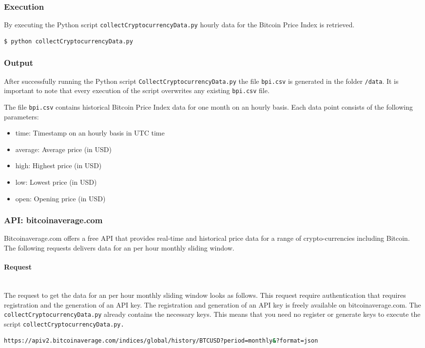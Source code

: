 \documentclass[a4paper,12pt]{article}
\begin{document}
\begin{spacing}{1.2}
\subsubsection{Execution}
By executing the Python script \verb|collectCryptocurrencyData.py| hourly data for the Bitcoin Price Index is retrieved.
\begin{lstlisting}[language=bash]
    $ python collectCryptocurrencyData.py
\end{lstlisting}

\subsubsection{Output}
After successfully running the Python script \verb|CollectCryptocurrencyData.py| the file \verb|bpi.csv| is generated in the folder \verb|/data|. It is important to note that every execution of the script overwrites any existing \verb|bpi.csv| file.

The file \verb|bpi.csv| contains historical Bitcoin Price Index data for one month on an hourly basis. Each data point consists of the following parameters:
\begin{itemize}
    \item time: Timestamp on an hourly basis in UTC time
    \item average: Average price (in USD)
    \item high: Highest price (in USD)
    \item low: Lowest price (in USD)
    \item open: Opening price (in USD)
\end{itemize}

\subsubsection{API: bitcoinaverage.com}
Bitcoinaverage.com offers a free API that provides real-time and historical price data for a range of crypto-currencies including Bitcoin. The following requests delivers data for an per hour monthly sliding window.

\paragraph{Request}\mbox{}\\
The request to get the data for an per hour monthly sliding window looks as follows. This request require authentication that requires registration and the generation of an API key. The registration and generation of an API key is freely available on bitcoinaverage.com. The \verb|collectCryptocurrencyData.py| already contains the necessary keys. This means that you need no register or generate keys to execute the script \verb|collectCryptocurrencyData.py.| 
\begin{lstlisting}[language=bash]
https://apiv2.bitcoinaverage.com/indices/global/history/BTCUSD?period=monthly&?format=json
\end{lstlisting}


\end{spacing}
\end{document}
